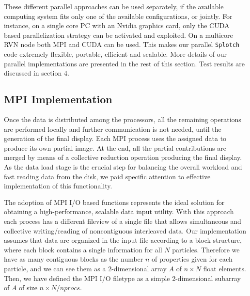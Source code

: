 \documentclass[1p,times]{elsarticle}
\begin{document}
These different parallel approaches can be used separately, 
if the available computing system fits only one of the available configurations, or jointly. 
For instance, on a single core PC with an Nvidia graphics card, only the CUDA based
parallelization strategy can be activated and exploited. On a multicore RVN \cite{rvn} 
node both MPI and CUDA can be used. This makes our parallel {\tt Splotch} code 
extremely flexible, portable, efficient and scalable. More details of our parallel implementations are presented in the rest of this section. Test results are discussed in section 4.

\subsection{MPI Implementation}
\label{mpi}

Once the data is distributed among the processors, all the remaining operations 
are performed locally and further communication is not needed, until the generation
of the final display. Each MPI process uses the assigned 
data to produce its own partial image. At the end, all the partial contributions are merged by means of a
collective reduction operation producing the final display. As the data load stage is the crucial step for balancing the overall workload and fast reading 
data from the disk, we paid specific attention to effective implementation of this functionality.

The adoption of MPI I/O based functions represents the ideal solution for obtaining
a high-performance, scalable data input utility.
With this approach each process has a different fileview of a single file 
that allows simultaneous and collective
writing/reading of noncontiguous interleaved data. 
Our implementation assumes that data are organized in the input file according to a block structure, 
where each block contains a single information for 
all $N$ particles. Therefore we have as many contiguous blocks
as the number $n$ of properties given for each particle, and we can see them as a 2-dimensional array $A$ 
of $n \times N$ float elements. 
Then, we have defined the MPI I/O filetype as a simple 2-dimensional subarray of $A$ 
of size $n \times N/nprocs$.
\end{document}
